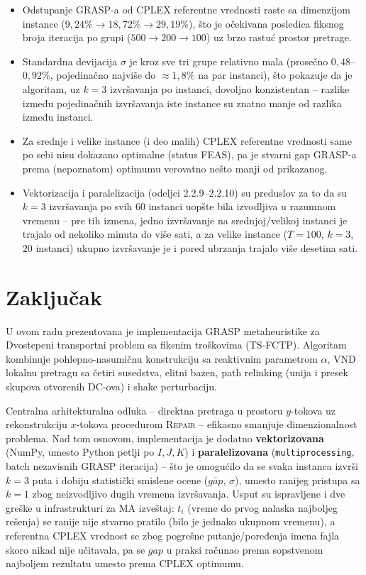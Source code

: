 \documentclass[12pt,a4paper]{article}
\begin{document}
\begin{itemize}
  \item Odstupanje GRASP-a od CPLEX referentne vrednosti raste sa
    dimenzijom instance ($9{,}24\%\to18{,}72\%\to29{,}19\%$), što je
    očekivana posledica fiksnog broja iteracija po grupi ($500\to200\to100$)
    uz brzo rastuć prostor pretrage.
  \item Standardna devijacija $\sigma$ je kroz sve tri grupe relativno
    mala (prosečno $0{,}48$--$0{,}92\%$, pojedinačno najviše do
    $\approx 1{,}8\%$ na par instanci), što pokazuje da je algoritam, uz
    $k=3$ izvršavanja po instanci, dovoljno konzistentan -- razlike između
    pojedinačnih izvršavanja iste instance su znatno manje od razlika
    između instanci.
  \item Za srednje i velike instance (i deo malih) CPLEX referentne
    vrednosti same po sebi nisu dokazano optimalne (status FEAS), pa je
    stvarni gap GRASP-a prema (nepoznatom) optimumu verovatno nešto manji
    od prikazanog.
  \item Vektorizacija i paralelizacija (odeljci 2.2.9--2.2.10) su
    preduslov za to da su $k=3$ izvršavanja po svih $60$ instanci uopšte
    bila izvodljiva u razumnom vremenu -- pre tih izmena, jedno izvršavanje
    na srednjoj/velikoj instanci je trajalo od nekoliko minuta do više sati,
    a za velike instance ($T=100$, $k=3$, $20$ instanci) ukupno izvršavanje
    je i pored ubrzanja trajalo više desetina sati.
\end{itemize}

\section{Zaključak}

U ovom radu prezentovana je implementacija GRASP metaheuristike za
Dvostepeni transportni problem sa fiksnim troškovima (TS-FCTP). Algoritam
kombinuje pohlepno-nasumičnu konstrukciju sa reaktivnim parametrom $\alpha$,
VND lokalnu pretragu sa četiri susedstva, elitni bazen, path relinking
(unija i presek skupova otvorenih DC-ova) i shake perturbaciju.

Centralna arhitekturalna odluka -- direktna pretraga u prostoru $y$-tokova
uz rekonstrukciju $x$-tokova procedurom \textsc{Repair} -- efikasno smanjuje
dimenzionalnost problema. Nad tom osnovom, implementacija je dodatno
\textbf{vektorizovana} (NumPy, umesto Python petlji po $I,J,K$) i
\textbf{paralelizovana} (\texttt{multiprocessing}, batch nezavisnih
GRASP iteracija) -- što je omogućilo da se svaka instanca izvrši $k=3$
puta i dobiju statistički smislene ocene ($\overline{gap}$, $\sigma$),
umesto ranijeg pristupa sa $k=1$ zbog neizvodljivo dugih vremena
izvršavanja. Usput su ispravljene i dve greške u infrastrukturi za MA
izveštaj: $t_i$ (vreme do prvog nalaska najboljeg rešenja) se ranije nije
stvarno pratilo (bilo je jednako ukupnom vremenu), a referentna CPLEX
vrednost se zbog pogrešne putanje/poređenja imena fajla skoro nikad nije
učitavala, pa se $gap$ u praksi računao prema sopstvenom najboljem
rezultatu umesto prema CPLEX optimumu.
\end{document}
